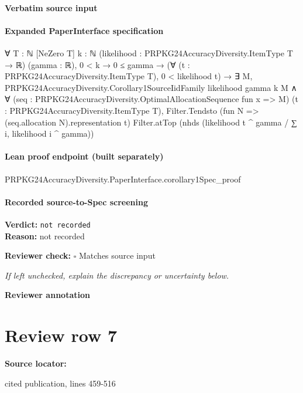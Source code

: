 \documentclass[10pt]{article}
\newcommand{\reviewerbox}{%
  \par\noindent\fbox{\parbox{0.96\linewidth}{\rule{0pt}{0.38in}}}\par
}
\newcommand{\reviewmatch}[1]{%
  \par\noindent\textbf{Reviewer check:} $\square$\; #1\par
  \noindent\emph{If left unchecked, explain the discrepancy or uncertainty below.}\par
}
\begin{document}
\paragraph{Verbatim source input}
\begin{ReviewVerbatim}
\end{ReviewVerbatim}


\paragraph{Expanded PaperInterface specification}
\begin{ReviewVerbatim}
∀ {T : ℕ} [NeZero T] {k : ℕ} (likelihood : PRPKG24AccuracyDiversity.ItemType T → ℝ) (gamma : ℝ),
  0 < k →
    0 ≤ gamma →
      (∀ (t : PRPKG24AccuracyDiversity.ItemType T), 0 < likelihood t) →
        ∃ M,
          PRPKG24AccuracyDiversity.Corollary1SourceIidFamily likelihood gamma k M ∧
            ∀ (seq : PRPKG24AccuracyDiversity.OptimalAllocationSequence fun x => M)
              (t : PRPKG24AccuracyDiversity.ItemType T),
              Filter.Tendsto (fun N => (seq.allocation N).representation t) Filter.atTop
                (nhds (likelihood t ^ gamma / ∑ i, likelihood i ^ gamma))
\end{ReviewVerbatim}

\paragraph{Lean proof endpoint (built separately)}\begin{ReviewVerbatim}
PRPKG24AccuracyDiversity.PaperInterface.corollary1Spec_proof
\end{ReviewVerbatim}

\paragraph{Recorded source-to-Spec screening}
\textbf{Verdict:} \texttt{not recorded}
\\
\textbf{Reason:} not recorded
\reviewmatch{Matches source input}
\noindent\textbf{Reviewer annotation}\par
\reviewerbox
\clearpage
\hypertarget{source-claim-e58423f2214d3283}{}
\section*{Review row 7}
\textbf{Source locator:} {\footnotesize\raggedright cited publication, lines 459-\allowbreak{}516\par}
\end{document}
